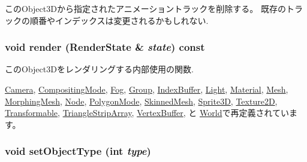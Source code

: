 このObject3Dから指定されたアニメーショントラックを削除する。 既存のトラックの順番やインデックスは変更されるかもしれない. \hypertarget{classm3g_1_1Object3D_8babc8a79b78615da51161e94029eea9}{
\subsubsection[{render}]{\setlength{\rightskip}{0pt plus 5cm}void render ({\bf RenderState} \& {\em state}) const}}
\label{classm3g_1_1Object3D_8babc8a79b78615da51161e94029eea9}


このObject3Dをレンダリングする内部使用の関数. 

\hyperlink{classm3g_1_1Camera_8babc8a79b78615da51161e94029eea9}{Camera}, \hyperlink{classm3g_1_1CompositingMode_8babc8a79b78615da51161e94029eea9}{CompositingMode}, \hyperlink{classm3g_1_1Fog_8babc8a79b78615da51161e94029eea9}{Fog}, \hyperlink{classm3g_1_1Group_8babc8a79b78615da51161e94029eea9}{Group}, \hyperlink{classm3g_1_1IndexBuffer_8babc8a79b78615da51161e94029eea9}{IndexBuffer}, \hyperlink{classm3g_1_1Light_8babc8a79b78615da51161e94029eea9}{Light}, \hyperlink{classm3g_1_1Material_8babc8a79b78615da51161e94029eea9}{Material}, \hyperlink{classm3g_1_1Mesh_8babc8a79b78615da51161e94029eea9}{Mesh}, \hyperlink{classm3g_1_1MorphingMesh_8babc8a79b78615da51161e94029eea9}{MorphingMesh}, \hyperlink{classm3g_1_1Node_8babc8a79b78615da51161e94029eea9}{Node}, \hyperlink{classm3g_1_1PolygonMode_8babc8a79b78615da51161e94029eea9}{PolygonMode}, \hyperlink{classm3g_1_1SkinnedMesh_8babc8a79b78615da51161e94029eea9}{SkinnedMesh}, \hyperlink{classm3g_1_1Sprite3D_8babc8a79b78615da51161e94029eea9}{Sprite3D}, \hyperlink{classm3g_1_1Texture2D_8babc8a79b78615da51161e94029eea9}{Texture2D}, \hyperlink{classm3g_1_1Transformable_8babc8a79b78615da51161e94029eea9}{Transformable}, \hyperlink{classm3g_1_1TriangleStripArray_8babc8a79b78615da51161e94029eea9}{TriangleStripArray}, \hyperlink{classm3g_1_1VertexBuffer_8babc8a79b78615da51161e94029eea9}{VertexBuffer}, と \hyperlink{classm3g_1_1World_8babc8a79b78615da51161e94029eea9}{World}で再定義されています。\hypertarget{classm3g_1_1Object3D_777701a101d1332abffa2ad6a255b91d}{
\subsubsection[{setObjectType}]{\setlength{\rightskip}{0pt plus 5cm}void setObjectType (int {\em type})}}
\label{classm3g_1_1Object3D_777701a101d1332abffa2ad6a255b91d}


